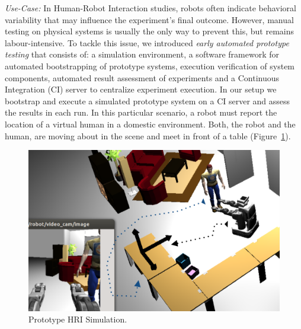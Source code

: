 \documentclass[conference]{IEEEtran}
\begin{document}
\emph{Use-Case:} In Human-Robot Interaction studies, robots often indicate
behavioral variability that may influence the experiment's final outcome.
However, manual testing on physical systems is usually the only way to prevent
this, but remains labour-intensive. To tackle this issue, we introduced
\emph{early automated prototype testing} \cite{2645922} that consists of: a
simulation environment, a software framework for automated bootstrapping of
prototype systems, execution verification of system components, automated result
assessment of experiments \cite{2563606} and a Continuous Integration (CI)
\cite{duvall2007continuous} server to centralize experiment execution. In our
setup we bootstrap and execute a simulated prototype system on a CI server and
assess the results in each run. In this particular scenario, a robot must report
the location of a virtual human in a domestic environment. Both, the robot and
the human, are moving about in the scene and meet in front of a table
(Figure~\ref{fig|proto}).

\begin{figure}[H]
      \centering
      \includegraphics[width=0.9\linewidth]{proto-setup.png}
      \caption{Prototype HRI Simulation.}
      \label{fig|proto}
\end{figure}
\end{document}
